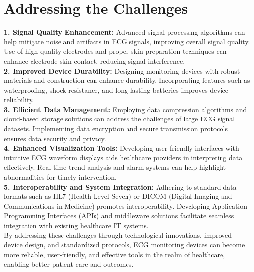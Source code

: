 \section{Addressing the Challenges}
\textbf{1. Signal Quality Enhancement:}
Advanced signal processing algorithms can help mitigate noise and artifacts in ECG signals, improving overall signal quality.
Use of high-quality electrodes and proper skin preparation techniques can enhance electrode-skin contact, reducing signal interference.
\\
\textbf{2. Improved Device Durability:}
Designing monitoring devices with robust materials and construction can enhance durability.
Incorporating features such as waterproofing, shock resistance, and long-lasting batteries improves device reliability.
\\
\textbf{3. Efficient Data Management:}
Employing data compression algorithms and cloud-based storage solutions can address the challenges of large ECG signal datasets.
Implementing data encryption and secure transmission protocols ensures data security and privacy.
\\
\textbf{4. Enhanced Visualization Tools:}
Developing user-friendly interfaces with intuitive ECG waveform displays aids healthcare providers in interpreting data effectively.
Real-time trend analysis and alarm systems can help highlight abnormalities for timely intervention.
\\
\textbf{5. Interoperability and System Integration:}
Adhering to standard data formats such as HL7 (Health Level Seven) or DICOM (Digital Imaging and Communications in Medicine) promotes interoperability.
Developing Application Programming Interfaces (APIs) and middleware solutions facilitate seamless integration with existing healthcare IT systems.
\\
By addressing these challenges through technological innovations, improved device design, and standardized protocols, ECG monitoring devices can become more reliable, user-friendly, and effective tools in the realm of healthcare, enabling better patient care and outcomes.
\\
